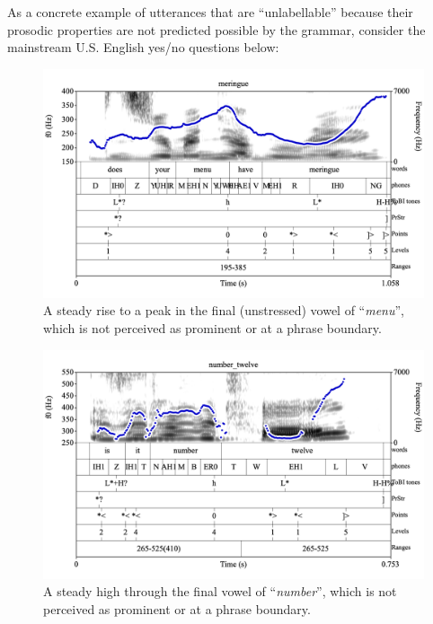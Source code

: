 \documentclass[11pt, twoside]{memoir}
\def\langtext#1{\textit{#1}}
\begin{document}
As a concrete example of utterances that are “unlabellable” because their prosodic properties are not predicted possible by the grammar, consider the mainstream U.S. English yes/no questions below:

\begin{figure}[H]
\centering
%
\includegraphics[width=.875\linewidth]{Usages-meringue.png}
%
\caption{A steady rise to a peak in the final (unstressed) vowel of “\langtext{menu}”, which is not perceived as prominent or at a phrase boundary.%
\label{fig:Usages meringue}%
}
\end{figure}

\begin{figure}[H]
\centering
%
\includegraphics[width=.875\linewidth]{Usages-number_twelve.png}
%
\caption{A steady high through the final vowel of “\langtext{number}”, which is not perceived as prominent or at a phrase boundary.%
\label{fig:Usages number twelve}%
}
\end{figure}
\end{document}
